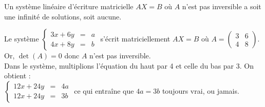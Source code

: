 \documentclass{cornouaille}
\begin{document}
\begin{remarque}
Un système linéaire d'écriture matricielle $AX=B$ où $A$ n'est pas inversible a soit une infinité de solutions, soit aucune.
\end{remarque}




\begin{exemple}
Le système $\left\{\begin{array}{lcc}
3x+6y & = & a \\
4x+8y & = & b
\end{array}\right.$ s'écrit matriciellement $AX=B$ où $A=\begin{pmatrix}
   3 & 6 \\
   4 & 8
 \end{pmatrix}$.\\
 Or, $\det(A)=0$ donc $A$ n'est pas inversible.\\
 Dans le système, multiplions l'équation du haut par 4 et celle du bas par 3. On obtient :\\
 $\left\{\begin{array}{lcc}
12x+24y & = & 4a \\
12x+24y & = & 3b
\end{array}\right.$ ce qui entraîne que $4a=3b$ toujours vrai, ou jamais.
\end{exemple}
\end{document}
